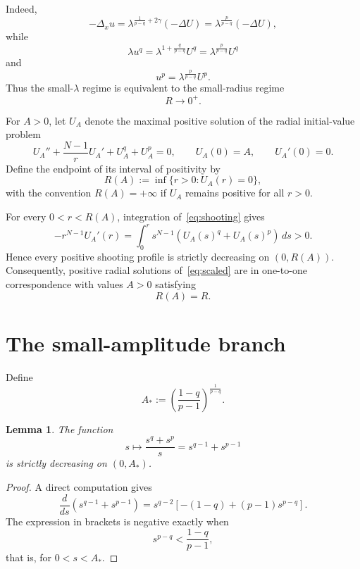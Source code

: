 \documentclass[11pt]{article}
\newtheorem{lemma}[theorem]{Lemma}
\theoremstyle{definition}
\begin{document}
Indeed,
\[
-\Delta_xu
=
\lambda^{\frac1{p-q}+2\gamma}(-\Delta U)
=
\lambda^{\frac{p}{p-q}}(-\Delta U),
\]
while
\[
\lambda u^q
=
\lambda^{1+\frac{q}{p-q}}U^q
=
\lambda^{\frac{p}{p-q}}U^q
\]
and
\[
u^p
=
\lambda^{\frac{p}{p-q}}U^p.
\]
Thus the small-$\lambda$ regime is equivalent to the small-radius
regime
\[
R\to0^+.
\]

For $A>0$, let $U_A$ denote the maximal positive solution of the
radial initial-value problem
\begin{equation}
\label{eq:shooting}
U_A''
+\frac{N-1}{r}U_A'
+U_A^q+U_A^p
=0,
\qquad
U_A(0)=A,
\qquad
U_A'(0)=0.
\end{equation}
Define the endpoint of its interval of positivity by
\begin{equation}
\label{eq:firstzero}
R(A)
:=
\inf\{r>0:U_A(r)=0\},
\end{equation}
with the convention $R(A)=+\infty$ if $U_A$ remains positive for all
$r>0$.

For every $0<r<R(A)$, integration of~\eqref{eq:shooting} gives
\begin{equation}
\label{eq:monotone}
-r^{N-1}U_A'(r)
=
\int_0^r
s^{N-1}
\left(U_A(s)^q+U_A(s)^p\right)\,ds>0.
\end{equation}
Hence every positive shooting profile is strictly decreasing on
$(0,R(A))$. Consequently, positive radial solutions
of~\eqref{eq:scaled} are in one-to-one correspondence with values
$A>0$ satisfying
\[
R(A)=R.
\]

  
\section{The small-amplitude branch}




Define
\begin{equation}
\label{eq:Astar}
A_*
:=
\left(
\frac{1-q}{p-1}
\right)^{\frac1{p-q}}.
\end{equation}

\begin{lemma}
\label{lem:ratio}
The function
\[
s\longmapsto
\frac{s^q+s^p}{s}
=
s^{q-1}+s^{p-1}
\]
is strictly decreasing on $(0,A_*)$.
\end{lemma}

\begin{proof}
A direct computation gives
\[
\frac{d}{ds}
\left(
s^{q-1}+s^{p-1}
\right)
=
s^{q-2}
\left[
-(1-q)+(p-1)s^{p-q}
\right].
\]
The expression in brackets is negative exactly when
\[
s^{p-q}<\frac{1-q}{p-1},
\]
that is, for $0<s<A_*$.
\end{proof}
\end{document}

